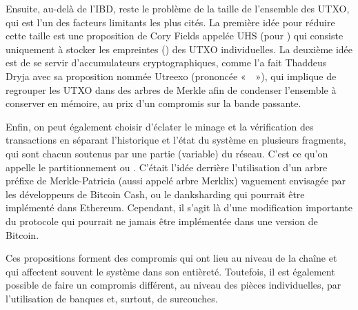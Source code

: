 Ensuite, au-delà de l'IBD, reste le problème de la taille de l'ensemble des UTXO, qui est l'un des facteurs limitants les plus cités. La première idée pour réduire cette taille est une proposition de Cory Fields appelée UHS (pour ) qui consiste uniquement à stocker les empreintes () des UTXO individuelles. La deuxième idée est de se servir d'accumulateurs cryptographiques, comme l'a fait Thaddeus Dryja avec sa proposition nommée Utreexo (prononcée «~~»), qui implique de regrouper les UTXO dans des arbres de Merkle afin de condenser l'ensemble à conserver en mémoire, au prix d'un compromis sur la bande passante.


Enfin, on peut également choisir d'éclater le minage et la vérification des transactions en séparant l'historique et l'état du système en plusieurs fragments, qui sont chacun soutenus par une partie (variable) du réseau. C'est ce qu'on appelle le partitionnement ou . C'était l'idée derrière l'utilisation d'un arbre préfixe de Merkle-Patricia (aussi appelé arbre Merklix) vaguement envisagée par les développeurs de Bitcoin Cash, ou le danksharding qui pourrait être implémenté dans Ethereum. Cependant, il s'agit là d'une modification importante du protocole qui pourrait ne jamais être implémentée dans une version de Bitcoin.

%
Ces propositions forment des compromis qui ont lieu au niveau de la chaîne et qui affectent souvent le système dans son entièreté. Toutefois, il est également possible de faire un compromis différent, au niveau des pièces individuelles, par l'utilisation de banques et, surtout, de surcouches.

